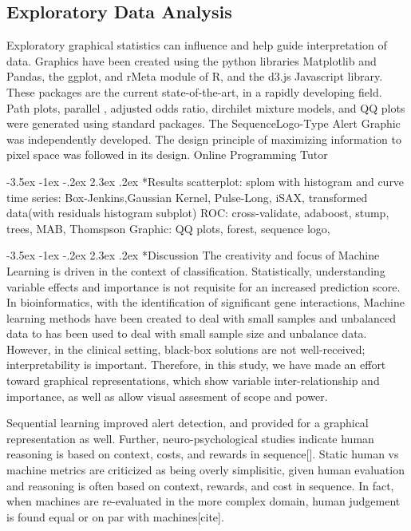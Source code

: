 \documentclass[12pt]{article}
\makeatletter
\renewcommand\section{\@startsection{section}{1}{\z@}%
                                  {-3.5ex \@plus -1ex \@minus -.2ex}%
                                  {2.3ex \@plus.2ex}%
                                  {\normalfont\bfseries}}
\makeatother
\begin{document}
\subsection*{Exploratory Data Analysis }
Exploratory graphical statistics can influence and help guide interpretation of data.  Graphics have been created using the python libraries Matplotlib and Pandas, the ggplot, and rMeta module of R, and the d3.js Javascript library.  These packages are the current state-of-the-art, in a rapidly developing field.  Path plots, parallel , adjusted odds ratio, dirchilet mixture models, and QQ plots were generated using standard packages.  The SequenceLogo-Type Alert Graphic was independently developed.  The design principle of maximizing information to pixel space was followed in its design. 
Online Programming Tutor


\section*{Results}
scatterplot:
splom with histogram and curve
time series:
Box-Jenkins,Gaussian Kernel, Pulse-Long, iSAX, transformed data(with residuals histogram subplot)
ROC:
cross-validate, adaboost, stump, trees, MAB, Thomspson
Graphic:
QQ plots, forest, sequence logo, 




\section*{Discussion}
The creativity and focus of Machine Learning is driven in the context of classification.  Statistically, understanding variable effects and importance is not requisite for an increased prediction score.  In bioinformatics, with the identification of significant gene interactions, Machine learning methods have been created to deal with small samples and unbalanced data\cite{Tib} to has been used to deal with small sample size and unbalance data.  However, in the clinical setting, black-box solutions are not well-received; interpretability is important.  Therefore, in this study, we have made an effort toward graphical representations, which show variable inter-relationship and importance, as well as allow visual assesment of scope and power.  

  Sequential learning improved alert detection, and provided for a graphical representation as well.  Further, neuro-psychological studies indicate human reasoning is based on context, costs, and rewards in sequence[].  Static human vs machine metrics are criticized as being overly simplisitic, given human evaluation and reasoning is often based on context, rewards, and cost in sequence.  In fact, when machines are re-evaluated in the more complex domain, human judgement is found equal or on par with machines[cite].
\end{document}
